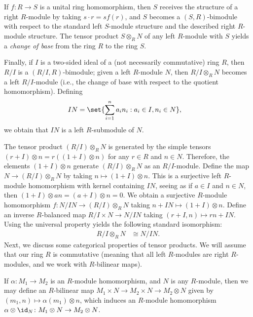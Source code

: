 \documentclass[10pt]{mypackage}
\begin{document}
If $f\colon R\rightarrow S$ is a unital ring homomorphism, then $S$ receives the structure of a right $R$-module by taking $s\cdot r = sf\left( r \right)$, and $S$ becomes a $\left( S,R \right)$-bimodule with respect to the standard left $S$-module structure and the described right $R$-module structure. The tensor product $S\otimes_{R}N$ of any left $R$-module with $S$ yields a \textit{change of base} from the ring $R$ to the ring $S$.

Finally, if $I$ is a two-sided ideal of a (not necessarily commutative) ring $R$, then $R/I$ is a $\left( R/I,R \right)$-bimodule; given a left $R$-module $N$, then $R/I\otimes_{R}N$ becomes a left $R/I$-module (i.e., the change of base with respect to the quotient homomorphism). Defining
\begin{align*}
  IN &= \set{\sum_{i=1}^{n}a_in_i : a_i\in I, n_i\in N},
\end{align*}
we obtain that $IN$ is a left $R$-submodule of $N$.

The tensor product $\left( R/I \right)\otimes_{R}N$ is generated by the simple tensors $\left( r+I \right)\otimes n = r\left( \left( 1 + I \right)\otimes n \right)$ for any $r\in R$ and $n\in N$. Therefore, the elements $\left( 1+I \right)\otimes n$ generate $\left( R/I \right)\otimes_{R}N$ as an $R/I$-module. Define the map $N\rightarrow \left( R/I \right)\otimes_{R}N$ by taking $n\mapsto \left( 1+I \right)\otimes n$. This is a surjective left $R$-module homomorphism with kernel containing $IN$, seeing as if $a\in I$ and $n\in N$, then $\left( 1+I \right)\otimes an = \left( a + I \right)\otimes n = 0$. We obtain a surjective $R$-module homomorphism $f\colon N/IN\rightarrow \left( R/I \right)\otimes_{R}N$ taking $n + IN\mapsto \left( 1+I \right)\otimes n$. Define an inverse $R$-balanced map $R/I\times N\rightarrow N/IN$ taking $\left( r + I,n \right)\mapsto rn + IN$. Using the universal property yields the following standard isomorphism:
\begin{align*}
  R/I\otimes_{R}N &\cong N/IN.
\end{align*}
Next, we discuss some categorical properties of tensor products. We will assume that our ring $R$ is commutative (meaning that all left $R$-modules are right $R$-modules, and we work with $R$-bilinear maps).

If $\alpha\colon M_1\rightarrow M_2$ is an $R$-module homomorphism, and $N$ is any $R$-module, then we may define an $R$-bilinear map $M_1\times N\rightarrow M_2\times N\rightarrow M_2\otimes N$ given by $\left( m_1,n \right)\mapsto \alpha\left( m_1 \right)\otimes n$, which induces an $R$-module homomorphism $\alpha\otimes \id_N\colon M_1\otimes N\rightarrow M_2\otimes N$.
\end{document}
